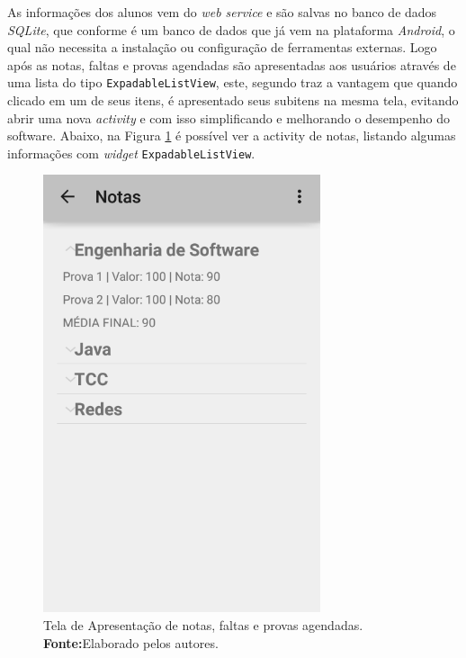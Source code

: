 	\par As informações dos alunos vem do \textit{web service} e são salvas no
banco de dados \textit{SQLite}, que conforme  é um
banco de dados que já vem na plataforma \textit{Android}, o qual não necessita
a instalação ou configuração de ferramentas externas. Logo após as notas, faltas
e provas agendadas são apresentadas aos usuários através de uma lista do tipo
\texttt{ExpadableListView}, este, segundo  traz a vantagem
que quando clicado em um de seus itens, é apresentado seus subitens na mesma
tela, evitando abrir uma nova \textit{activity} e com isso simplificando e
melhorando o desempenho do software. Abaixo, na Figura \ref{fig:dr4} é possível
ver a activity de notas, listando algumas informações com \textit{widget}
\texttt{ExpadableListView}.

\begin{figure}[h!]
	\centerline{\includegraphics[scale=0.5]{./imagens/3_discussao_resultados/dr4.png}}
	\caption[Tela de Apresentação de notas, faltas e provas agendadas]{Tela de
	Apresentação de notas, faltas e provas agendadas.
		\textbf{Fonte:}Elaborado pelos autores.}
	\label{fig:dr4}
\end{figure}
\pagebreak


